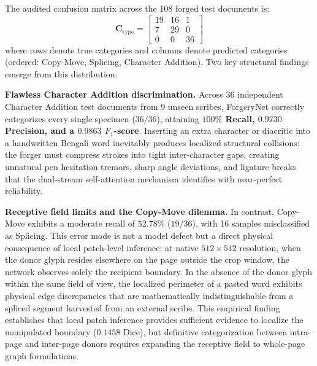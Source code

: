 \documentclass[pdflatex,sn-mathphys-num,iicol]{sn-jnl}
\begin{document}
\noindent
The audited confusion matrix across the 108 forged test documents is:
\begin{equation}
\mathbf{C}_{\text{type}} = \begin{bmatrix}
19 & 16 & 1 \\
7 & 29 & 0 \\
0 & 0 & 36
\end{bmatrix}\label{eq_confusion}
\end{equation}
where rows denote true categories and columns denote predicted categories (ordered: Copy-Move, Splicing, Character Addition). Two key structural findings emerge from this distribution:

\noindent
\textbf{Flawless Character Addition discrimination.} Across 36 independent Character Addition test documents from 9 unseen scribes, ForgeryNet correctly categorizes every single specimen ($36/36$), attaining \textbf{$100\%$ Recall, $0.9730$ Precision, and a $0.9863$ $F_1$-score}. Inserting an extra character or diacritic into a handwritten Bengali word inevitably produces localized structural collisions: the forger must compress strokes into tight inter-character gaps, creating unnatural pen hesitation tremors, sharp angle deviations, and ligature breaks that the dual-stream self-attention mechanism identifies with near-perfect reliability.

\noindent
\textbf{Receptive field limits and the Copy-Move dilemma.} In contrast, Copy-Move exhibits a moderate recall of $52.78\%$ ($19/36$), with 16 samples misclassified as Splicing. This error mode is not a model defect but a direct physical consequence of local patch-level inference: at native $512 \times 512$ resolution, when the donor glyph resides elsewhere on the page outside the crop window, the network observes solely the recipient boundary. In the absence of the donor glyph within the same field of view, the localized perimeter of a pasted word exhibits physical edge discrepancies that are mathematically indistinguishable from a spliced segment harvested from an external scribe. This empirical finding establishes that local patch inference provides sufficient evidence to localize the manipulated boundary ($0.1458$ Dice), but definitive categorization between intra-page and inter-page donors requires expanding the receptive field to whole-page graph formulations.
\end{document}
